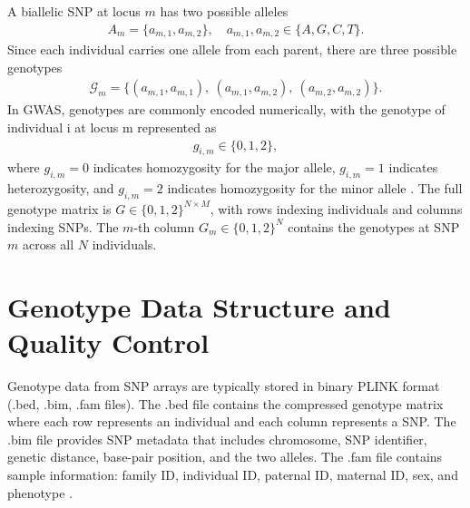 A biallelic SNP at locus $m$ has two possible alleles
\begin{align*}
A_m = \{a_{m,1}, a_{m,2}\}, \quad a_{m,1}, a_{m,2} \in \{A, G, C, T\}.
\end{align*}
Since each individual carries one allele from each parent, there are three possible genotypes
\begin{align*}
\mathcal{G}_m = \{(a_{m,1}, a_{m,1}),\ (a_{m,1}, a_{m,2}),\ (a_{m,2}, a_{m,2})\}.
\end{align*}
In GWAS, genotypes are commonly encoded numerically, with the genotype of individual i at locus m represented as
\begin{align*}
    g_{i,m} \in \{0, 1, 2\},
\end{align*}
where $g_{i,m} = 0$ indicates homozygosity for the major allele, $g_{i,m} = 1$ indicates heterozygosity, and $g_{i,m} = 2$ indicates homozygosity for the minor allele \citep{Graffelman2007}. The full genotype matrix is $G \in \{0,1,2\}^{N \times M}$, with rows indexing individuals and columns indexing SNPs. The $m$-th column $G_m \in \{0,1,2\}^N$ contains the genotypes at SNP $m$ across all $N$ individuals.


\section{Genotype Data Structure and Quality Control}

Genotype data from SNP arrays are typically stored in binary PLINK format (.bed, .bim, .fam files). The .bed file contains the compressed genotype matrix where each row represents an individual and each column represents a SNP. The .bim file provides SNP metadata that includes chromosome, SNP identifier, genetic distance, base-pair position, and the two alleles. The .fam file contains sample information: family ID, individual ID, paternal ID, maternal ID, sex, and phenotype \citep{Marees2018}.

